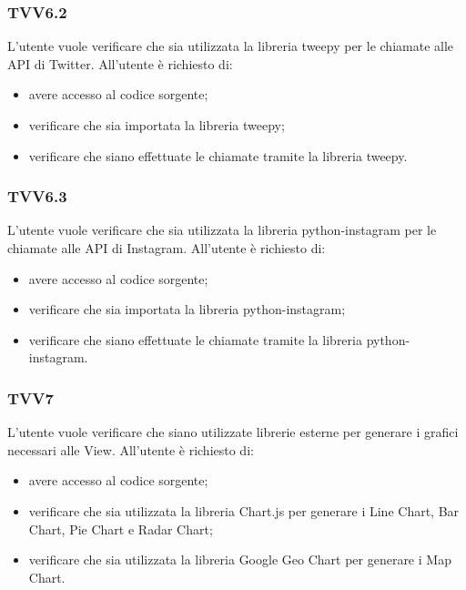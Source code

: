 		\subsubsection{TVV6.2}
			L'utente vuole verificare che sia utilizzata la libreria tweepy per le chiamate alle API di Twitter. All'utente è richiesto di:
			\begin{itemize}
				\item avere accesso al codice sorgente;
				\item verificare che sia importata la libreria tweepy;
				\item verificare che siano effettuate le chiamate tramite la libreria tweepy.
			\end{itemize}
			
		\subsubsection{TVV6.3}
			L'utente vuole verificare che sia utilizzata la libreria python-instagram per le chiamate alle API di Instagram. All'utente è richiesto di:
			\begin{itemize}
				\item avere accesso al codice sorgente;
				\item verificare che sia importata la libreria python-instagram;
				\item verificare che siano effettuate le chiamate tramite la libreria python-instagram.
			\end{itemize}
			
		\subsubsection{TVV7}
			L'utente vuole verificare che siano utilizzate librerie esterne per generare i grafici necessari alle View. All'utente è richiesto di:
			\begin{itemize}
				\item avere accesso al codice sorgente;
				\item verificare che sia utilizzata la libreria Chart.js per generare i Line Chart, Bar Chart, Pie Chart e Radar Chart;
				\item verificare che sia utilizzata la libreria Google Geo Chart per generare i Map Chart.
			\end{itemize}
			
